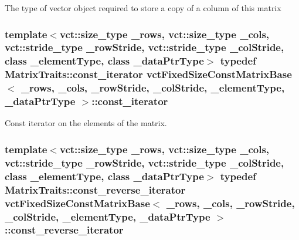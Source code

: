 The type of vector object required to store a copy of a column of this matrix \hypertarget{classvct_fixed_size_const_matrix_base_a896eacc5ccf7915b3e109bf9dbded884}{
\subsubsection[{const\-\_\-iterator}]{\setlength{\rightskip}{0pt plus 5cm}template$<$vct\-::size\-\_\-type \-\_\-rows, vct\-::size\-\_\-type \-\_\-cols, vct\-::stride\-\_\-type \-\_\-row\-Stride, vct\-::stride\-\_\-type \-\_\-col\-Stride, class \-\_\-element\-Type, class \-\_\-data\-Ptr\-Type$>$ typedef {\bf Matrix\-Traits\-::const\-\_\-iterator} {\bf vct\-Fixed\-Size\-Const\-Matrix\-Base}$<$ \-\_\-rows, \-\_\-cols, \-\_\-row\-Stride, \-\_\-col\-Stride, \-\_\-element\-Type, \-\_\-data\-Ptr\-Type $>$\-::{\bf const\-\_\-iterator}}}\label{classvct_fixed_size_const_matrix_base_a896eacc5ccf7915b3e109bf9dbded884}
Const iterator on the elements of the matrix. \hypertarget{classvct_fixed_size_const_matrix_base_a86918b3da51e15dce72b62abdc6378fa}{
\subsubsection[{const\-\_\-reverse\-\_\-iterator}]{\setlength{\rightskip}{0pt plus 5cm}template$<$vct\-::size\-\_\-type \-\_\-rows, vct\-::size\-\_\-type \-\_\-cols, vct\-::stride\-\_\-type \-\_\-row\-Stride, vct\-::stride\-\_\-type \-\_\-col\-Stride, class \-\_\-element\-Type, class \-\_\-data\-Ptr\-Type$>$ typedef {\bf Matrix\-Traits\-::const\-\_\-reverse\-\_\-iterator} {\bf vct\-Fixed\-Size\-Const\-Matrix\-Base}$<$ \-\_\-rows, \-\_\-cols, \-\_\-row\-Stride, \-\_\-col\-Stride, \-\_\-element\-Type, \-\_\-data\-Ptr\-Type $>$\-::{\bf const\-\_\-reverse\-\_\-iterator}}}\label{classvct_fixed_size_const_matrix_base_a86918b3da51e15dce72b62abdc6378fa}
